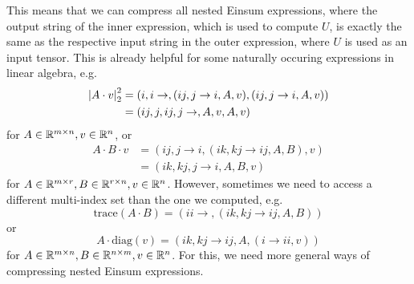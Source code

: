 

This means that we can compress all nested Einsum expressions, where the output string of the inner expression, which is used to compute $U$, is exactly the same as the respective input string in the outer expression, where $U$ is used as an input tensor.
This is already helpful for some naturally occuring expressions in linear algebra, e.g.
\begin{align*}
    \left\lvert A \cdot v \right\rvert_2^2 & = (i,i\rightarrow,(ij, j \rightarrow i, A, v),(ij, j \rightarrow i, A, v)) \\
                        & = (ij,j,ij,j\rightarrow,A,v,A,v)
\end{align*}
for $A \in \mathbb{R}^{m \times n}, v \in \mathbb{R}^{n}$, or
\begin{align*}
    A \cdot B \cdot v & = (ij, j \rightarrow i, (ik, kj \rightarrow ij, A, B), v) \\
                      & = (ik,kj,j \rightarrow i, A, B, v)
\end{align*}
for $A \in \mathbb{R}^{m \times r}, B \in \mathbb{R}^{r \times n}, v \in \mathbb{R}^n$.
However, sometimes we need to access a different multi-index set than the one we computed, e.g.
$$\text{trace}(A \cdot B) = (ii \rightarrow, (ik, kj \rightarrow ij, A, B))$$
or
$$A \cdot \text{diag}(v) = (ik, kj \rightarrow ij, A, (i \rightarrow ii, v))$$
for $A \in \mathbb{R}^{m \times n}, B \in \mathbb{R}^{n \times m}, v \in \mathbb{R}^{n}$.
For this, we need more general ways of compressing nested Einsum expressions.





% 


